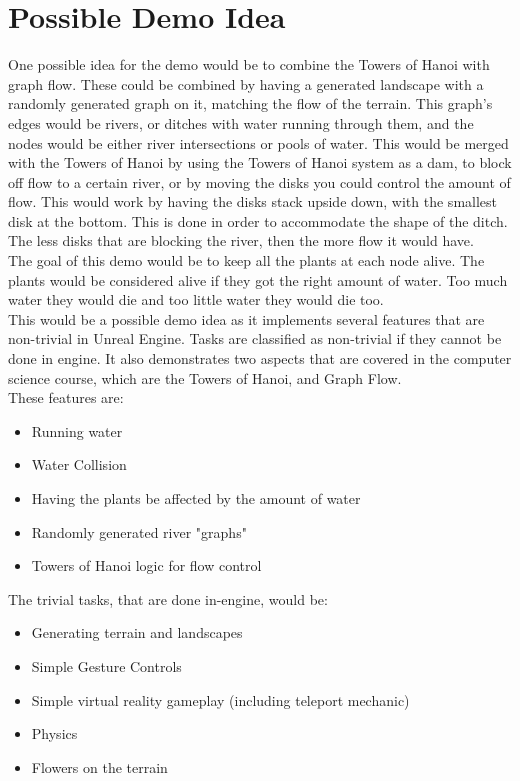 \section{Possible Demo Idea}
One possible idea for the demo would be to combine the Towers of Hanoi with graph flow. These could be combined by having a generated landscape with a randomly generated graph on it, matching the flow of the terrain. This graph's edges would be rivers, or ditches with water running through them, and the nodes would be either river intersections or pools of water. This would be merged with the Towers of Hanoi by using the Towers of Hanoi system as a dam, to block off flow to a certain river, or by moving the disks you could control the amount of flow. This would work by having the disks stack upside down, with the smallest disk at the bottom. This is done in order to accommodate the shape of the ditch. The less disks that are blocking the river, then the more flow it would have. \\
The goal of this demo would be to keep all the plants at each node alive. The plants would be considered alive if they got the right amount of water. Too much water they would die and too little water they would die too. \\
This would be a possible demo idea as it implements several features that are non-trivial in Unreal Engine. Tasks are classified as non-trivial if they cannot be done in engine. It also demonstrates two aspects that are covered in the computer science course, which are the Towers of Hanoi, and Graph Flow.\\ 
These features are: \\
\begin{itemize}
	\item Running water
	\item Water Collision
	\item Having the plants be affected by the amount of water
	\item Randomly generated river "graphs"
	\item Towers of Hanoi logic for flow control
\end{itemize}
The trivial tasks, that are done in-engine, would be:
\begin{itemize}
	\item Generating terrain and landscapes
	\item Simple Gesture Controls
	\item Simple virtual reality gameplay (including teleport mechanic)
	\item Physics
	\item Flowers on the terrain
\end{itemize}


